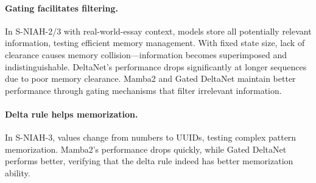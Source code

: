 \documentclass{article}
\begin{document}
\paragraph{Gating facilitates filtering.} In S-NIAH-2/3 with real-world-essay context, models store all potentially relevant information, testing efficient memory management. With fixed state size, lack of clearance causes memory collision—information becomes superimposed and indistinguishable. DeltaNet's performance drops significantly at longer sequences due to poor memory clearance. Mamba2 and Gated DeltaNet maintain better performance through gating mechanisms that filter irrelevant information.
\vspace{-1mm}
\paragraph{Delta rule helps memorization.} In S-NIAH-3, values change from numbers to UUIDs, testing complex pattern memorization. Mamba2's performance drops quickly, while Gated DeltaNet performs better, verifying that the delta rule indeed has better memorization ability.
\vspace{-3mm}
\end{document}
